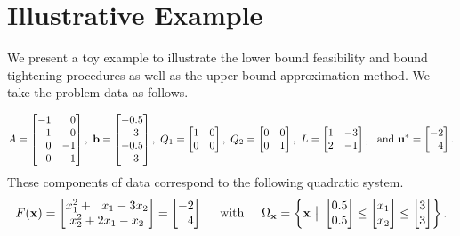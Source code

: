\section{Illustrative Example} \label{sec:expl}

We present a toy example to illustrate the lower bound feasibility and bound tightening procedures as well as the upper bound approximation method.
We take the problem data as follows.

\[
A=
\begin{bmatrix}
  -1 & \p 0  \\ 
\p 1 & \p 0  \\  
\p 0 & -1 \\
\p 0 & \p 1  
\end{bmatrix},%
~
\vb =
\begin{bmatrix}
  -0.5  \\ 
\p 3 \\  
  -0.5 \\
\p 3  
\end{bmatrix}, %
~
Q_1=
\begin{bmatrix}
  1 & 0  \\ 
  0 & 0  
\end{bmatrix},%
~
Q_2=
\begin{bmatrix}
  0 & 0  \\ 
  0 & 1  
\end{bmatrix},%
~
L=
\begin{bmatrix}
  1 & -3  \\ 
  2 & -1  
\end{bmatrix}, %
~\mbox{ and }
\vu^*=
\begin{bmatrix}
  -2  \\ 
\p 4   
\end{bmatrix}.%
\]
%
These components of data correspond to the following quadratic system.
\[
F(\vx) =
\begin{bmatrix}
  x_1^2 + ~~x_1 - 3x_2 \\
  x_2^2 +  2x_1 - x_2
\end{bmatrix}
=
\begin{bmatrix}
    -2 \\
    \p 4
\end{bmatrix}
\hspace*{0.15in}
\text{ with }
\hspace*{0.15in}
\Omega_{\vx} = \left\{ \vx ~\big\vert~
\begin{bmatrix}
  0.5 \\
  0.5
\end{bmatrix}
\leq 
\begin{bmatrix}
  x_1 \\
  x_2
\end{bmatrix}
\leq
\begin{bmatrix}
  3 \\
  3
\end{bmatrix}
\right\}.
\]
